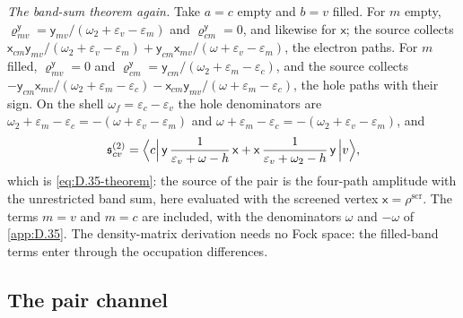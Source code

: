 \emph{The band-sum theorem again.} Take $a = c$ empty and $b = v$ filled. For $m$ empty, $\varrho^{\mathsf{y}}_{mv} = \mathsf{y}_{mv}/(\omega_2 + \varepsilon_v - \varepsilon_m)$ and $\varrho^{\mathsf{y}}_{cm} = 0$, and likewise for $\mathsf{x}$; the source collects $\mathsf{x}_{cm}\mathsf{y}_{mv}/(\omega_2 + \varepsilon_v - \varepsilon_m) + \mathsf{y}_{cm}\mathsf{x}_{mv}/(\omega + \varepsilon_v - \varepsilon_m)$, the electron paths. For $m$ filled, $\varrho^{\mathsf{y}}_{mv} = 0$ and $\varrho^{\mathsf{y}}_{cm} = \mathsf{y}_{cm}/(\omega_2 + \varepsilon_m - \varepsilon_c)$, and the source collects $-\mathsf{y}_{cm}\mathsf{x}_{mv}/(\omega_2 + \varepsilon_m - \varepsilon_c) - \mathsf{x}_{cm}\mathsf{y}_{mv}/(\omega + \varepsilon_m - \varepsilon_c)$, the hole paths with their sign. On the shell $\omega_f = \varepsilon_c - \varepsilon_v$ the hole denominators are $\omega_2 + \varepsilon_m - \varepsilon_c = -(\omega + \varepsilon_v - \varepsilon_m)$ and $\omega + \varepsilon_m - \varepsilon_c = -(\omega_2 + \varepsilon_v - \varepsilon_m)$, and
\begin{equation*}
  \mathfrak{s}^{(2)}_{cv} = \Bigl\langle c\Bigl|\,\mathsf{y}\,\frac{1}{\varepsilon_v + \omega - h}\,\mathsf{x} + \mathsf{x}\,\frac{1}{\varepsilon_v + \omega_2 - h}\,\mathsf{y}\,\Bigr|v\Bigr\rangle ,
\end{equation*}
which is \cref{eq:D.35-theorem}: the source of the pair is the four-path amplitude with the unrestricted band sum, here evaluated with the screened vertex $\mathsf{x} = \rho^{\mathrm{scr}}$. The terms $m = v$ and $m = c$ are included, with the denominators $\omega$ and $-\omega$ of \cref{app:D.35}. The density-matrix derivation needs no Fock space: the filled-band terms enter through the occupation differences.

\subsection*{The pair channel}

